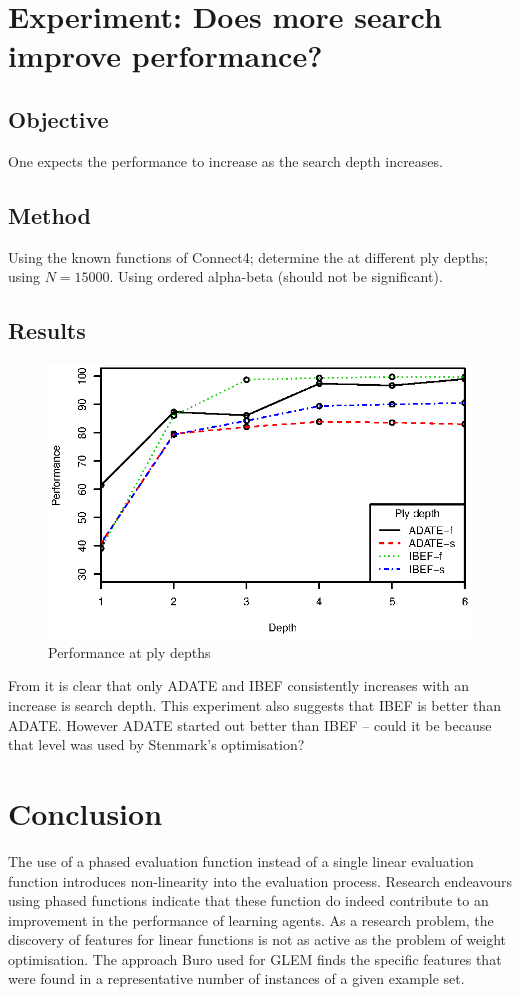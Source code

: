 \section{Experiment: Does more search improve performance?}
\subsection*{Objective}
One expects the performance to increase as the search depth increases.
\subsection*{Method}
Using the known functions of Connect4; determine the  at different ply depths; using $N = 15000$.
Using ordered alpha-beta (should not be significant).
\subsection*{Results}
\begin{figure}[ht]
	\centering
		\includegraphics{artifacts/c4-350.eps}
	\caption{Performance at ply depths}
	\label{fig:patply}
\end{figure}
From  it is clear that only ADATE and IBEF consistently increases with an increase is search depth.  This experiment also suggests that IBEF is better than ADATE.  However ADATE started out better than IBEF -- could it be because that level was used by Stenmark's \cite{stenmark:masters} optimisation?

\section{Conclusion}
\label{sec:learning-conclusion}
The use of a phased evaluation function instead of a single linear evaluation function introduces non-linearity into the evaluation process. Research endeavours using phased functions indicate that these function do indeed contribute to an improvement in the  performance of learning agents.  As a research problem, the discovery of features for linear functions is not as active as the problem of weight optimisation.  The approach Buro used for GLEM finds the specific features that were found in a representative number of instances of a given example set.

